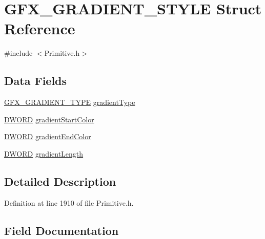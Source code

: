 \hypertarget{struct_g_f_x___g_r_a_d_i_e_n_t___s_t_y_l_e}{}\section{G\+F\+X\+\_\+\+G\+R\+A\+D\+I\+E\+N\+T\+\_\+\+S\+T\+Y\+L\+E Struct Reference}
\label{struct_g_f_x___g_r_a_d_i_e_n_t___s_t_y_l_e}


{\ttfamily \#include $<$Primitive.\+h$>$}

\subsection*{Data Fields}
\begin{DoxyCompactItemize}
\item 
\hyperlink{_primitive_8h_ab1c97d13cc8365b9e8629af87b1e03b7}{G\+F\+X\+\_\+\+G\+R\+A\+D\+I\+E\+N\+T\+\_\+\+T\+Y\+P\+E} \hyperlink{struct_g_f_x___g_r_a_d_i_e_n_t___s_t_y_l_e_a385df9969778859af3352c401ec1f261}{gradient\+Type}
\item 
\hyperlink{_generic_type_defs_8h_ad342ac907eb044443153a22f964bf0af}{D\+W\+O\+R\+D} \hyperlink{struct_g_f_x___g_r_a_d_i_e_n_t___s_t_y_l_e_a75c3626df1829f77593d8913bbb4daf2}{gradient\+Start\+Color}
\item 
\hyperlink{_generic_type_defs_8h_ad342ac907eb044443153a22f964bf0af}{D\+W\+O\+R\+D} \hyperlink{struct_g_f_x___g_r_a_d_i_e_n_t___s_t_y_l_e_ac2233576c4684b6968652e6346bb633c}{gradient\+End\+Color}
\item 
\hyperlink{_generic_type_defs_8h_ad342ac907eb044443153a22f964bf0af}{D\+W\+O\+R\+D} \hyperlink{struct_g_f_x___g_r_a_d_i_e_n_t___s_t_y_l_e_aa6e5b52c234fdd3904270b3efb302647}{gradient\+Length}
\end{DoxyCompactItemize}


\subsection{Detailed Description}


Definition at line 1910 of file Primitive.\+h.



\subsection{Field Documentation}
\hypertarget{struct_g_f_x___g_r_a_d_i_e_n_t___s_t_y_l_e_ac2233576c4684b6968652e6346bb633c}{}
